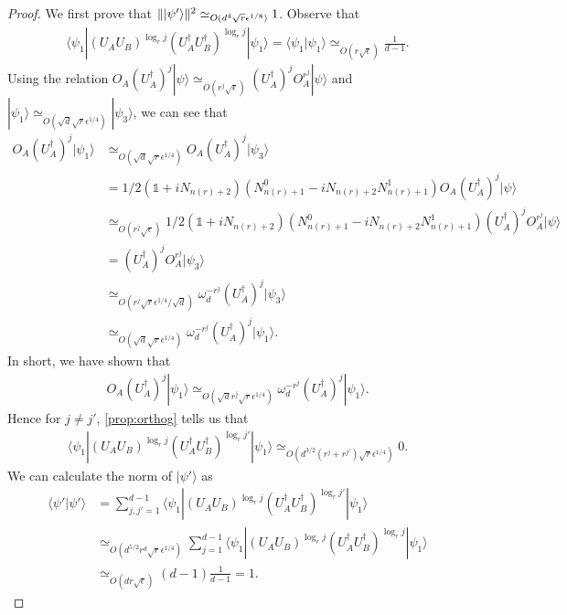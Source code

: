 \documentclass[11pt,letterpaper]{article}
\newcommand{\ket}[1]{|#1\rangle}
\newcommand{\bra}[1]{\langle#1|}
\newcommand{\braket}[2]{\langle#1|#2\rangle}
\newcommand{\ct}{^{\dagger}}
\DeclarePairedDelimiter{\norm}{\lVert}{\rVert}
\newcommand{\1}{\mathbb{1}}
\newcommand{\nr}{n(r)}
\newcommand{\ep}{\epsilon}
\newcommand{\se}{\sqrt{\epsilon}}
\newcommand{\qe}{\epsilon^{1/4}}
\newcommand{\sd}{\sqrt{d}}
\newcommand{\sr}{\sqrt{r}}
\newcommand{\appd}[1]{\simeq_{#1}}
\theoremstyle{definition}
\begin{document}
\begin{proof}
	We first prove that $\norm{\ket{\psi'}}^2 \appd{O(d^4 \sr \ep^{1/8})} 1$.
	Observe that 
	\begin{align}
		\bra{\psi_1} (U_AU_B)^{\log_r j} (U_A\ct U_B\ct)^{\log_r j}  \ket{\psi_1} =
		\braket{\psi_1}{\psi_1} \appd{O(r\se)} \frac{1}{d-1}.
	\end{align}
	Using the relation $O_A(U_A\ct)^j \ket{\psi} \appd{O(r^j \se)} (U_A\ct)^j O_A^{r^j}\ket{\psi}$ and $\ket{\psi_1} \appd{O(\sd \sr \qe)} \ket{\psi_3}$,
        we can see that 
        \begin{align}
            	O_A (U_A\ct)^j \ket{\psi_1} &\appd{O(\sd \sr \qe)} O_A(U_A\ct)^j \ket{\psi_3} \\
            	& = 1/2 (\1 + i N_{\nr+2})(N_{\nr+1}^0 - iN_{\nr+2}N_{\nr+1}^1) O_A (U_A\ct)^j \ket{\psi} \\
            	& \appd{O(r^j \se)} 1/2  (\1 + i N_{\nr+2})(N_{\nr+1}^0 - iN_{\nr+2}N_{\nr+1}^1)  (U_A\ct)^j O_A^{r^j} \ket{\psi} \\
            	& = (U_A\ct)^j O_A^{r^j} \ket{\psi_3} \\
            	& \appd{O(r^j \sr \qe/\sd)} \omega_d^{-r^j}(U_A\ct)^j \ket{\psi_3} \\
            	& \appd{O(\sd \sr\qe)} \omega_d^{-r^j}  (U_A\ct)^j \ket{\psi_1}.
        \end{align}
        In short, we have shown that 
        \begin{align}
        		O_A (U_A\ct)^j \ket{\psi_1} \appd{O(\sd r^j \sr \qe)}\omega_d^{-r^j}  (U_A\ct)^j \ket{\psi_1}.
        \end{align}
	Hence for $j \neq j'$, \cref{prop:orthog} tells us that  
	\begin{align}
		\bra{\psi_1} (U_AU_B)^{\log_r j} (U_A\ct U_B\ct)^{\log_r j'} \ket{\psi_1} \appd{O(d^{3/2} (r^j + r^{j'})\sr \qe)} 0.
	\end{align}
	We can calculate the norm of $\ket{\psi'}$ as 
	\begin{align}
		\braket{\psi'}{\psi'} &=\sum_{j,j'=1}^{d-1} \bra{\psi_1} (U_AU_B)^{\log_r j} (U_A\ct U_B\ct)^{\log_r j'} \ket{\psi_1}\\
		&\appd{O(d^{5/2} r^d \sr \qe)} \sum_{j=1}^{d-1} \bra{\psi_1} (U_AU_B)^{\log_r j} (U_A\ct U_B\ct)^{\log_r j} \ket{\psi_1}\\
		&\appd{O(dr\se)} (d-1) \frac{1}{d-1} = 1.
	\end{align}
	

\end{proof}
\end{document}
